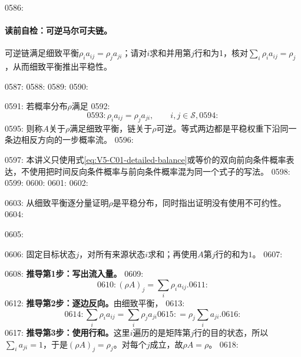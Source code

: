 0586: \paragraph{读前自检：可逆马尔可夫链。}可逆链满足细致平衡$\rho_i a_{ij}=\rho_j a_{ji}$；请对$i$求和并用第$j$行和为1，核对$\sum_i\rho_i a_{ij}=\rho_j$，从而细致平衡推出平稳性。\par
0587: 
0588: 
0589: 
0590: \begin{definition}[细致平衡与可逆性]
0591: 若概率分布$\rho$满足
0592: \begin{equation}\label{eq:V5-C01-detailed-balance}
0593: \rho_i a_{ij}=\rho_j a_{ji},\qquad i,j\in\mathcal S,
0594: \end{equation}
0595: 则称$A$关于$\rho$满足细致平衡，链关于$\rho$可逆。等式两边都是平稳权重下沿同一条边相反方向的一步概率流。
0596: \end{definition}
0597: 本讲义只使用式\eqref{eq:V5-C01-detailed-balance}或等价的双向前向条件概率表达，不使用把时间反向条件概率与前向条件概率混为同一个式子的写法。
0598: 
0599: %
0600: 
0601: 
0602: \begin{derivationgoalbox}
0603: 从细致平衡逐分量证明$\rho$是平稳分布，同时指出证明没有使用不可约性。
0604: \end{derivationgoalbox}
0605: \begin{derivationprepbox}
0606: 固定目标状态$j$，对所有来源状态$i$求和；再使用$A$第$j$行的和为$1$。
0607: \end{derivationprepbox}
0608: \textbf{推导第1步：写出流入量。}
0609: \[
0610: (\rho A)_j=\sum_i\rho_i a_{ij}.
0611: \]
0612: \textbf{推导第2步：逐边反向。}由细致平衡，
0613: \[
0614: \sum_i\rho_i a_{ij}=\sum_i\rho_j a_{ji}
0615: =\rho_j\sum_i a_{ji}.
0616: \]
0617: \textbf{推导第3步：使用行和。}这里$i$遍历的是矩阵第$j$行的目的状态，所以$\sum_i a_{ji}=1$，于是$(\rho A)_j=\rho_j$。对每个$j$成立，故$\rho A=\rho$。
0618: 
